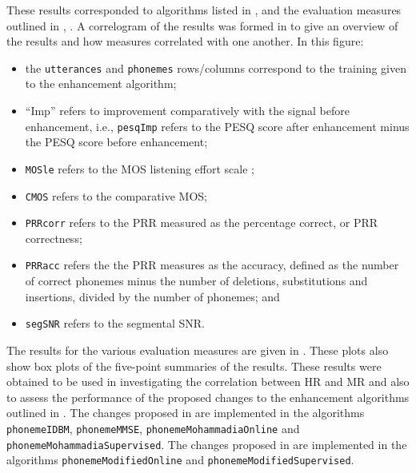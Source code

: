 These results corresponded to algorithms listed in ,
\textit{} and the evaluation measures outlined
in , \textit{}.
A correlogram of the results was formed in  to give
an overview of the results and how measures correlated with one another.
In this figure:
\begin{itemize}
\item the \lstinline!utterances! and \lstinline!phonemes! rows/columns
correspond to the training given to the enhancement algorithm;
\item ``Imp'' refers to improvement comparatively with the signal before
enhancement, i.e., \lstinline!pesqImp! refers to the \ac{PESQ} score
after enhancement minus the \ac{PESQ} score before enhancement;
\item \lstinline!MOSle! refers to the \ac{MOS} listening effort scale
\citep{InternationalTelecommunicationUnion1996};
\item \lstinline!CMOS! refers to the comparative \ac{MOS};
\item \lstinline!PRRcorr! refers to the \ac{PRR} measured as the percentage
correct, or \ac{PRR} correctness;
\item \lstinline!PRRacc! refers the the \ac{PRR} measures as the accuracy,
defined as the number of correct phonemes minus the number of deletions,
substitutions and insertions, divided by the number of phonemes; and
\item \lstinline!segSNR! refers to the segmental \ac{SNR}.
\end{itemize}
The results for the various evaluation measures are given in .
These plots also show box plots of the five-point summaries of the
results. These results were obtained to be used in investigating the
correlation between \ac{HR} and \ac{MR} and also to assess the performance
of the proposed changes to the enhancement algorithms outlined in
. The changes proposed in 
are implemented in the algorithms \lstinline[breaklines=true]!phonemeIDBM!,
\lstinline[breaklines=true]!phonemeMMSE!, \lstinline[breaklines=true]!phonemeMohammadiaOnline!
and \lstinline[breaklines=true]!phonemeMohammadiaSupervised!. The
changes proposed in  are implemented in the
algorithms \lstinline[breaklines=true]!phonemeModifiedOnline! and\linebreak{}
\lstinline[breaklines=true]!phonemeModifiedSupervised!.


